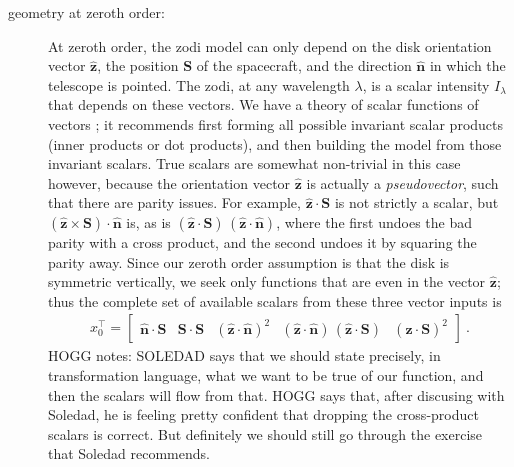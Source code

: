 \documentclass{article}
\renewcommand{\vec}[1]{\mathbf{#1}}
\begin{document}
\begin{description}
    \item[geometry at zeroth order:]
    At zeroth order, the zodi model can only depend on the disk orientation vector $\vec{\hat{z}}$,
    the position $\vec{S}$ of the spacecraft,
    and the direction $\vec{\hat{n}}$ in which the telescope is pointed.
    The zodi, at any wavelength $\lambda$, is a scalar intensity $I_\lambda$ that depends on these vectors.
    We have a theory of scalar functions of vectors \cite{scalars}; it recommends first forming all possible invariant scalar products (inner products or dot products), and then building the model from those invariant scalars.
    True scalars are somewhat non-trivial in this case however, because the orientation vector $\vec{\hat{z}}$ is actually a \emph{pseudovector}, such that there are parity issues.
    For example, $\vec{\hat{z}}\cdot\vec{S}$ is not strictly a scalar, but $(\vec{\hat{z}}\times\vec{S})\cdot\vec{\hat{n}}$ is,
    as is $(\vec{\hat{z}}\cdot\vec{S})\,(\vec{\hat{z}}\cdot\vec{\hat{n}})$, where the first undoes the bad parity with a cross product, and the second undoes it by squaring the parity away.
    Since our zeroth order assumption is that the disk is symmetric vertically, we seek only functions that are even in the vector $\vec{\hat{z}}$; thus the complete set of available scalars from these three vector inputs is
    \begin{align}
        x_0^\top = \begin{bmatrix}
        \vec{\hat{n}} \cdot \vec{S} &
        \vec{S} \cdot \vec{S} &
        (\vec{\hat{z}} \cdot \vec{\hat{n}})^2 &
        (\vec{\hat{z}} \cdot \vec{\hat{n}})\,(\vec{\hat{z}} \cdot \vec{S}) &
        (\vec{\hat{z}} \cdot \vec{S})^2
        \end{bmatrix} ~.
    \end{align}
    HOGG notes: SOLEDAD says that we should state precisely, in transformation language, what we want to be true of our function, and then the scalars will flow from that. HOGG says that, after discusing with Soledad, he is feeling pretty confident that dropping the cross-product scalars is correct. But definitely we should still go through the exercise that Soledad recommends.


\end{description}
\end{document}
